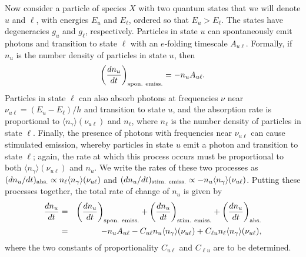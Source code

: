 Now consider a particle of species $X$ with two quantum states that we will denote $u$ and $\ell$, with energies $E_u$ and $E_\ell$, ordered so that $E_u > E_\ell$. The states have degeneracies $g_u$ and $g_\ell$, respectively. Particles in state $u$ can spontaneously emit photons and transition to state $\ell$ with an $e$-folding timescale $A_{u\ell}$. Formally, if $n_u$ is the number density of particles in state $u$, then
\begin{equation}
\left(\frac{dn_u}{dt}\right)_{\rm spon.~emiss.} = -n_u A_{u\ell}.
\end{equation}
Particles in state $\ell$ can also absorb photons at frequencies $\nu$ near $\nu_{u\ell} = (E_u-E_\ell)/h$ and transition to state $u$, and the absorption rate is proportional to $\langle n_\gamma\rangle(\nu_{u\ell})$ and $n_\ell$, where $n_\ell$ is the number density of particles in state $\ell$. Finally, the presence of photons with frequencies near $\nu_{u\ell}$ can cause stimulated emission, whereby particles in state $u$ emit a photon and transition to state $\ell$; again, the rate at which this process occurs must be proportional to both $\langle n_\gamma\rangle(\nu_{u\ell})$ and $n_u$. We write the rates of these two processes as $(dn_u/dt)_{\rm abs.} \propto n_\ell \langle n_\gamma\rangle(\nu_{u\ell})$ and $(dn_u/dt)_{\rm stim.~emiss.} \propto -n_u \langle n_\gamma\rangle(\nu_{u\ell})$. Putting these processes together, the total rate of change of $n_u$ is given by
\begin{eqnarray}
\frac{dn_u}{dt} & = & \left(\frac{dn_u}{dt}\right)_{\rm spon.~emiss.} + \left(\frac{dn_u}{dt}\right)_{\rm stim.~emiss.} + \left(\frac{dn_u}{dt}\right)_{\rm abs.} \\
& = & -n_u A_{u\ell} - C_{u\ell} n_u \langle n_\gamma\rangle(\nu_{u\ell}) + C_{\ell u} n_\ell \langle n_\gamma\rangle(\nu_{u\ell}),
\label{eq:dnudt}
\end{eqnarray}
where the two constants of proportionality $C_{u\ell}$ and $C_{\ell u}$ are to be determined.

